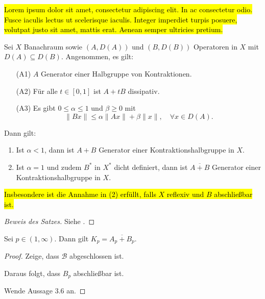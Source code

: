\hl{Lorem ipsum dolor sit amet, consectetur adipiscing elit. In ac consectetur odio. Fusce iaculis lectus ut scelerisque iaculis. Integer imperdiet turpis posuere, volutpat justo sit amet, mattis erat. Aenean semper ultricies pretium.}


\begin{fsatz}
Sei $X$ Banachraum sowie  $(A, D(A))$ und $(B, D(B))$ Operatoren in $X$ mit $D(A)\subseteq D(B)$. Angenommen, es gilt:
\begin{enumerate}
\item[\textnormal{(A1)}] $A$ Generator einer Halbgruppe von Kontraktionen.
\item[\textnormal{(A2)}] Für alle $t\in[0, 1]$ ist  $A+tB$ dissipativ.
\item[\textnormal{(A3)}] Es gibt $0\leq\alpha\leq 1 $ und $\beta\geq0$ mit
\begin{equation}
\|Bx\|\leq \alpha\|Ax\| + \beta\|x\|,\quad \forall x\in D(A).
\end{equation}
\end{enumerate}
Dann gilt:
\begin{enumerate}
\item Ist $\alpha < 1$, dann ist $A+B$ Generator einer Kontraktionshalbgruppe in $X$.
\item Ist $\alpha =1$ und zudem $B^*$ in $X^*$ dicht definiert, dann ist $\overline{A+B}$ Generator einer Kontraktionshalbgruppe in $X$.
\end{enumerate}
\end{fsatz}

\begin{bem}
\hl{Insbesondere ist die Annahme in (2) erfüllt, falls $X$ reflexiv und $B$ abschließbar ist.}
\end{bem}

\begin{proof}[Beweis des Satzes]
Siehe \cite{}.
\end{proof}



\begin{prop}
Sei $p\in(1,\infty)$. Dann gilt $K_p=\overline{A_p + B_p}$.
\end{prop}

\begin{proof}
\par
Zeige, dass $\mathcal B$ abgeschlossen ist.

\par
Daraus folgt, dass $B_p$ abschließbar ist.

\par
Wende Aussage 3.6 an.

\end{proof}


